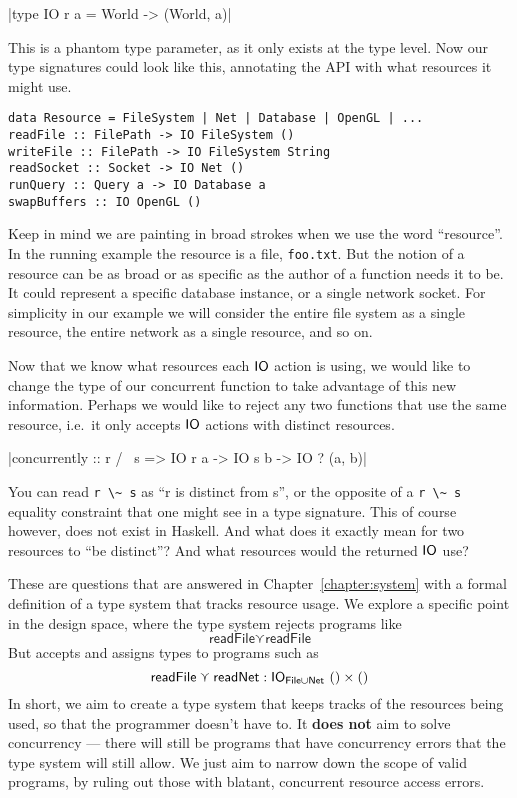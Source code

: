 \documentclass{report}
\begin{document}
|type IO r a = World -> (World, a)|

This is a phantom type parameter, as it only exists at the type level. Now our
type signatures could look like this, annotating the API with what resources it
might use.

\begin{verbatim}
data Resource = FileSystem | Net | Database | OpenGL | ...
readFile :: FilePath -> IO FileSystem ()
writeFile :: FilePath -> IO FileSystem String
readSocket :: Socket -> IO Net ()
runQuery :: Query a -> IO Database a
swapBuffers :: IO OpenGL ()
\end{verbatim}

Keep in mind we are painting in broad strokes when we use the word
``resource''. In the running example the resource is a file,
\texttt{foo.txt}. But the notion of a resource can be as broad or as specific as
the author of a function needs it to be. It could represent a specific database
instance, or a single network socket. For simplicity in our example we will
consider the entire file system as a single resource, the entire network as
a single resource, and so on.

Now that we know what resources each $\mathsf{IO}$ action is using, we would like to
change the type of our concurrent function to take advantage of this new
information. Perhaps we would like to reject any two functions that use the same
resource, i.e.\ it only accepts $\mathsf{IO}$ actions with distinct resources.

|concurrently :: r /~ s => IO r a -> IO s b -> IO ? (a, b)|

You can read \verb$r \~ s$ as ``r is distinct from s'', or the opposite of a
\verb$r \~ s$ equality constraint that one might see in a type signature. This
of course however, does not exist in Haskell.  And what does it exactly mean for
two resources to ``be distinct''? And what resources would the returned $\mathsf{IO}$
use?

These are questions that are answered in Chapter~\ref{chapter:system} with a
formal definition of a type system that tracks resource usage. We explore a
specific point in the design space, where the type system rejects programs like
\[
\textsf{readFile} \curlyvee \textsf{readFile}
\]
But accepts and assigns types to programs such as
\[
\textsf{readFile} \curlyvee \textsf{readNet} : \mathsf{IO}_{\textsf{File} \cup \textsf{Net}} \ () \times ()
\]
In short, we aim to create a type system that keeps tracks of the resources
being used, so that the programmer doesn't have to. It \textbf{does not} aim to
solve concurrency --- there will still be programs that have concurrency errors
that the type system will still allow. We just aim to narrow down the scope of
valid programs, by ruling out those with blatant, concurrent resource access
errors. 
\end{document}
